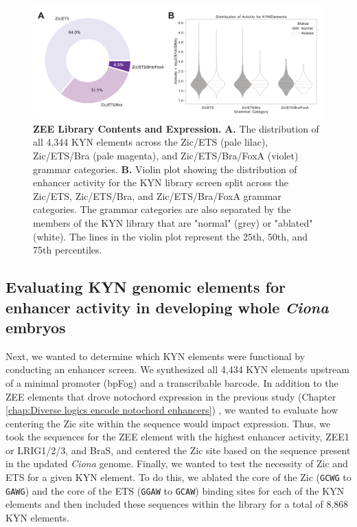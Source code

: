 \begin{figure}[h]
    \centering
    \includegraphics[scale=0.12]{3_figures-and-files/Fig2_Library-Information.png}
    \caption[ZEE Library Contents and Expression]{\textbf{ZEE Library Contents and Expression.} 
    \textbf{A.} The distribution of all 4,344 KYN elements across the Zic/ETS (pale lilac), Zic/ETS/Bra (pale magenta), and Zic/ETS/Bra/FoxA (violet) grammar categories. \textbf{B.} Violin plot showing the distribution of enhancer activity for the KYN library screen split across the Zic/ETS, Zic/ETS/Bra, and Zic/ETS/Bra/FoxA grammar categories. The grammar categories are also separated by the members of the KYN library that are "normal" (grey) or "ablated" (white). The lines in the violin plot represent the 25th, 50th, and 75th percentiles.}
    \label{fig:2 zee library}
\end{figure}

\subsection{Evaluating KYN genomic elements for enhancer activity in developing whole \textit{Ciona} embryos}

Next, we wanted to determine which KYN elements were functional by conducting an enhancer screen. We synthesized all 4,434 KYN elements upstream of a minimal promoter (bpFog) and a transcribable barcode. In addition to the ZEE elements that drove notochord expression in the previous study (Chapter \ref{chap:Diverse logics encode notochord enhancers}) \cite{song2022}, we wanted to evaluate how centering the Zic site within the sequence would impact expression. Thus, we took the sequences for the ZEE element with the highest enhancer activity, ZEE1 or LRIG1/2/3, and BraS, and centered the Zic site based on the sequence present in the updated \textit{Ciona} genome. Finally, we wanted to test the necessity of Zic and ETS for a given KYN element. To do this, we ablated the core of the Zic (\verb|GCWG| to \verb|GAWG|) and the core of the ETS (\verb|GGAW| to \verb|GCAW|) binding sites for each of the KYN elements and then included these sequences within the library for a total of 8,868 KYN elements. 


